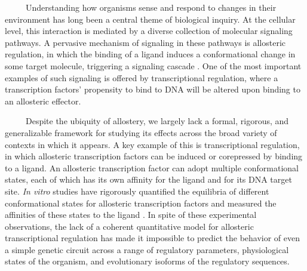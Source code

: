 \documentclass[12pt]{caltech_thesis}
\begin{document}
~~~~~Understanding how organisms sense and respond to changes in their
environment has long been a central theme of biological inquiry. At the
cellular level, this interaction is mediated by a diverse collection of
molecular signaling pathways. A pervasive mechanism of signaling in
these pathways is allosteric regulation, in which the binding of a
ligand induces a conformational change in some target molecule,
triggering a signaling cascade \autocite{lindsley2006a}. One of the most
important examples of such signaling is offered by transcriptional
regulation, where a transcription factors' propensity to bind to DNA
will be altered upon binding to an allosteric effector.

~~~~~Despite the ubiquity of allostery, we largely lack a formal,
rigorous, and generalizable framework for studying its effects across
the broad variety of contexts in which it appears. A key example of this
is transcriptional regulation, in which allosteric transcription factors
can be induced or corepressed by binding to a ligand. An allosteric
transcription factor can adopt multiple conformational states, each of
which has its own affinity for the ligand and for its DNA target site.
\emph{In vitro} studies have rigorously quantified the equilibria of
different conformational states for allosteric transcription factors and
measured the affinities of these states to the ligand
\autocite{harman2001,lanfranco2017}. In spite of these experimental
observations, the lack of a coherent quantitative model for allosteric
transcriptional regulation has made it impossible to predict the
behavior of even a simple genetic circuit across a range of regulatory
parameters, physiological states of the organism, and evolutionary
isoforms of the regulatory sequences.
\end{document}
